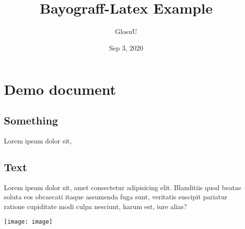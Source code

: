 \documentclass[12pt, a4paper]{article}
\author{GlosuU}
\title{Bayograff-Latex Example}
\date{Sep 3, 2020}
\begin{document}
\maketitle
\tableofcontents
\section{Demo document}

\subsection{Something}
Lorem ipsum dolor sit,

\subsection{Text}
Lorem ipsum dolor sit, amet consectetur adipisicing elit. Blanditiis quod beatae soluta eos obcaecati itaque assumenda fuga sunt, veritatis suscipit pariatur ratione cupiditate modi culpa nesciunt, harum est, iure alias?

\texttt{[image: image]}
\end{document}
